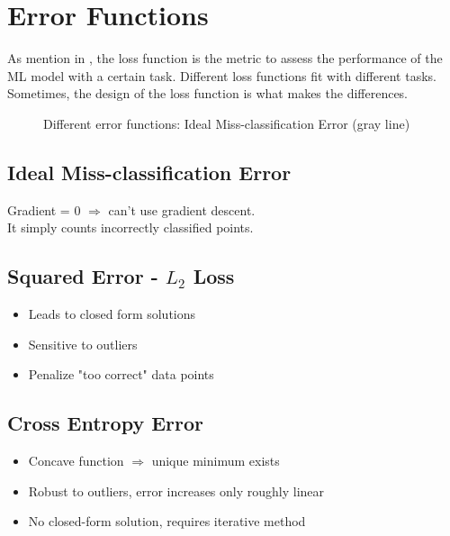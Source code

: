 \chapter{Error Functions}
As mention in , the loss function is the metric to assess the performance of the \ac{ML} model with a certain task. Different loss functions fit with different tasks. Sometimes, the design of the loss function is what makes the differences.


\begin{figure}[!h]
	\centering
	\caption{Different error functions: Ideal Miss-classification Error (gray line)}
\end{figure}

\section{Ideal Miss-classification Error}
Gradient = 0 $\Rightarrow$ can't use gradient descent.\\
It simply counts incorrectly classified points.

\section{Squared Error - $L_2$ Loss}
\begin{itemize}
	\item Leads to closed form solutions
	\item Sensitive to outliers
	\item Penalize "too correct" data points
\end{itemize}

\section{Cross Entropy Error}
\begin{itemize}
	\item Concave function $\Rightarrow$ unique minimum exists
	\item Robust to outliers, error increases only roughly linear
	\item No closed-form solution, requires iterative method
\end{itemize}

